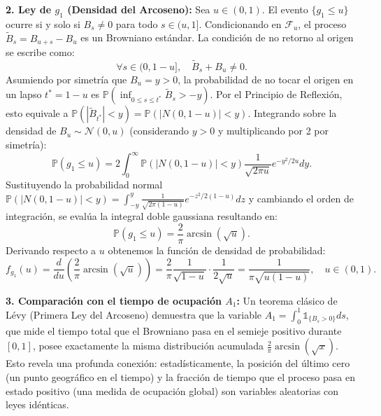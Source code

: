 \documentclass[11pt, letterpaper]{article}
\begin{document}
\begin{solucion}
    \textbf{2. Ley de $g_1$ (Densidad del Arcoseno):}
    Sea $u \in (0,1)$. El evento $\{g_1 \le u\}$ ocurre si y solo si $B_s \neq 0$ para todo $s \in (u, 1]$.
    Condicionando en $\mathcal{F}_u$, el proceso $\tilde{B}_s = B_{u+s} - B_u$ es un Browniano estándar.
    La condición de no retorno al origen se escribe como:
    \[ \forall s \in (0, 1-u], \quad \tilde{B}_s + B_u \neq 0. \]
    Asumiendo por simetría que $B_u = y > 0$, la probabilidad de no tocar el origen en un lapso $t^* = 1-u$ es $\mathbb{P}(\inf_{0 \le s \le t^*} \tilde{B}_s > -y)$.
    Por el Principio de Reflexión, esto equivale a $\mathbb{P}(|\tilde{B}_{t^*}| < y) = \mathbb{P}(|N(0, 1-u)| < y)$.
    Integrando sobre la densidad de $B_u \sim \mathcal{N}(0, u)$ (considerando $y>0$ y multiplicando por 2 por simetría):
    \[ \mathbb{P}(g_1 \le u) = 2 \int_0^\infty \mathbb{P}(|N(0, 1-u)| < y) \frac{1}{\sqrt{2\pi u}} e^{-y^2/2u} dy. \]
    Sustituyendo la probabilidad normal $\mathbb{P}(|N(0, 1-u)| < y) = \int_{-y}^y \frac{1}{\sqrt{2\pi(1-u)}} e^{-z^2/2(1-u)} dz$ y cambiando el orden de integración, se evalúa la integral doble gaussiana resultando en:
    \[ \mathbb{P}(g_1 \le u) = \frac{2}{\pi} \arcsin(\sqrt{u}). \]
    Derivando respecto a $u$ obtenemos la función de densidad de probabilidad:
    \[ f_{g_1}(u) = \frac{d}{du} \left( \frac{2}{\pi} \arcsin(\sqrt{u}) \right) = \frac{2}{\pi} \frac{1}{\sqrt{1-u}} \cdot \frac{1}{2\sqrt{u}} = \frac{1}{\pi \sqrt{u(1-u)}}, \quad u \in (0,1). \]

    \textbf{3. Comparación con el tiempo de ocupación $A_1$:}
    Un teorema clásico de Lévy (Primera Ley del Arcoseno) demuestra que la variable $A_1 = \int_0^1 \mathbb{1}_{\{B_s > 0\}} ds$, que mide el tiempo total que el Browniano pasa en el semieje positivo durante $[0,1]$, posee exactamente la misma distribución acumulada $\frac{2}{\pi} \arcsin(\sqrt{x})$. 
    Esto revela una profunda conexión: estadísticamente, la posición del último cero (un punto geográfico en el tiempo) y la fracción de tiempo que el proceso pasa en estado positivo (una medida de ocupación global) son variables aleatorias con leyes idénticas.
\end{solucion}

\newpage
\end{document}
